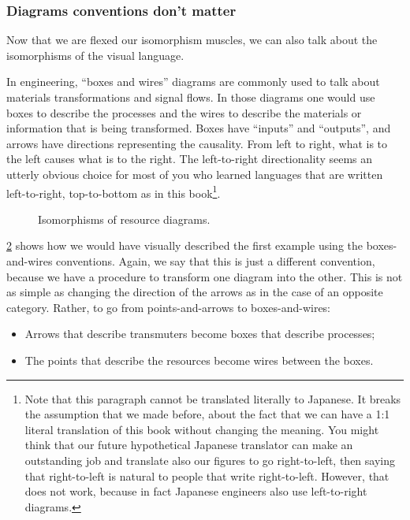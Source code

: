\begin{figure}[h!]
  \begin{center}
  \end{center}
  \caption{}
  \label{fig:inverted_2}
\end{figure}

\subsubsection{Diagrams conventions don't matter}

Now that we are flexed our isomorphism muscles, we can also talk about the isomorphisms
of the visual language.

In engineering, ``boxes and wires'' diagrams are commonly used to talk about
materials transformations and signal flows. In those diagrams one would use
boxes to describe the processes and the wires to describe the materials or information
that is being transformed. Boxes have ``inputs'' and ``outputs'', and arrows have
directions representing the causality. From left to right, what is to the left causes what is to the right.
The left-to-right directionality seems an utterly obvious choice for most of you
who learned languages that are written left-to-right, top-to-bottom as in this book\footnote{
  Note that this paragraph cannot be translated literally to Japanese. It breaks the assumption
  that we made before, about the fact that we can have a 1:1 literal translation of this book
  without changing the meaning. You might think that our future hypothetical Japanese
  translator can make an outstanding job and translate also our figures to go right-to-left,
  then saying that right-to-left is natural to people that write right-to-left. However,
  that does not work, because in fact Japanese engineers also use left-to-right diagrams.}.

\begin{figure}[h!]
  \centering
  
  \caption{Isomorphisms of resource diagrams. \label{fig:isodiagrams} }
\end{figure}


\cref{fig:isodiagrams} shows how we would have visually described
the first example using the boxes-and-wires conventions.
Again, we say that this is just a different convention, because
we have a procedure to transform one diagram into the other.
This is not as simple as changing the direction of the arrows as in the case of an
opposite category. Rather, to go from points-and-arrows to boxes-and-wires:
\begin{itemize}
  \item Arrows that describe transmuters become boxes that describe processes;
  \item The points that describe the resources become wires between the boxes.
\end{itemize}



%
%
%
%
